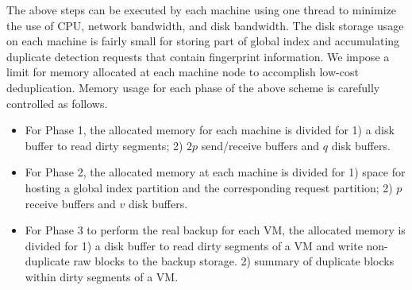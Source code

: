 

The above steps can be executed by each machine
using one thread to minimize the use of CPU, network bandwidth, and disk bandwidth.
The  disk storage usage on each machine 
is fairly small for  storing part of global index and
accumulating  duplicate detection requests that contain fingerprint information.   
We impose a limit for memory allocated at each machine node to accomplish low-cost deduplication.  
Memory usage for each phase of the above scheme is carefully controlled as follows.
\begin{itemize}
\item For Phase 1, the allocated memory for each machine is divided for 
1) a disk buffer to read dirty segments; 2) $2p$ send/receive buffers and $q$ disk buffers.

\item 
For Phase 2,  the allocated memory at each machine is divided for 1) space for hosting a global index partition and 
the corresponding request partition; 2) $p$ receive buffers and $v$ disk buffers.

\item For Phase 3 to  perform the real backup for each VM,
the allocated memory is divided for 1) a disk buffer to read dirty segments of a VM and   
write non-duplicate raw blocks to the  backup storage.
2) summary of duplicate blocks within dirty segments of  a VM.
\end{itemize}

